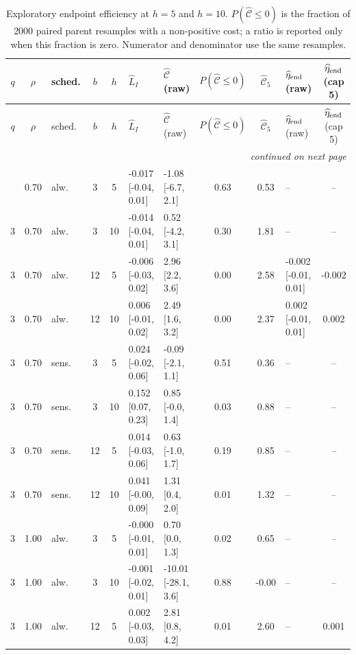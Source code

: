 \documentclass[10pt]{article}
\begin{document}
\begin{scriptsize}
\setlength{\tabcolsep}{3pt}
\begin{longtable}{cclcc l l c c l c}
\caption{Exploratory endpoint efficiency at $h=5$ and $h=10$. $P(\widehat{\mathcal C}\le0)$ is the fraction of 2000 paired parent resamples with a non-positive cost; a ratio is reported only when this fraction is zero. Numerator and denominator use the same resamples.}\label{tab:efficiency}\\
\toprule
$q$ & $\rho$ & sched. & $b$ & $h$ & $\widehat L_I$ & $\widehat{\mathcal C}$ (raw) & $P(\widehat{\mathcal C}\le0)$ & $\widehat{\mathcal C}_5$ & $\widehat\eta_{\rm end}$ (raw) & $\widehat\eta_{\rm end}$ (cap 5) \\
\midrule
\endfirsthead
\toprule
$q$ & $\rho$ & sched. & $b$ & $h$ & $\widehat L_I$ & $\widehat{\mathcal C}$ (raw) & $P(\widehat{\mathcal C}\le0)$ & $\widehat{\mathcal C}_5$ & $\widehat\eta_{\rm end}$ (raw) & $\widehat\eta_{\rm end}$ (cap 5) \\
\midrule
\endhead
\midrule
\multicolumn{11}{r}{\emph{continued on next page}}\\
\endfoot
\bottomrule
\endlastfoot
3 & 0.70 & alw. & 3 & 5 & -0.017 [-0.04, 0.01] & -1.08 [-6.7, 2.1] & 0.63 & 0.53 & -- & -- \\
3 & 0.70 & alw. & 3 & 10 & -0.014 [-0.04, 0.01] & 0.52 [-4.2, 3.1] & 0.30 & 1.81 & -- & -- \\
3 & 0.70 & alw. & 12 & 5 & -0.006 [-0.03, 0.02] & 2.96 [2.2, 3.6] & 0.00 & 2.58 & -0.002 [-0.01, 0.01] & -0.002 \\
3 & 0.70 & alw. & 12 & 10 & 0.006 [-0.01, 0.02] & 2.49 [1.6, 3.2] & 0.00 & 2.37 & 0.002 [-0.01, 0.01] & 0.002 \\
3 & 0.70 & sens. & 3 & 5 & 0.024 [-0.02, 0.06] & -0.09 [-2.1, 1.1] & 0.51 & 0.36 & -- & -- \\
3 & 0.70 & sens. & 3 & 10 & 0.152 [0.07, 0.23] & 0.85 [-0.0, 1.4] & 0.03 & 0.88 & -- & -- \\
3 & 0.70 & sens. & 12 & 5 & 0.014 [-0.03, 0.06] & 0.63 [-1.0, 1.7] & 0.19 & 0.85 & -- & -- \\
3 & 0.70 & sens. & 12 & 10 & 0.041 [-0.00, 0.09] & 1.31 [0.4, 2.0] & 0.01 & 1.32 & -- & -- \\
3 & 1.00 & alw. & 3 & 5 & -0.000 [-0.01, 0.01] & 0.70 [0.0, 1.3] & 0.02 & 0.65 & -- & -- \\
3 & 1.00 & alw. & 3 & 10 & -0.001 [-0.02, 0.01] & -10.01 [-28.1, 3.6] & 0.88 & -0.00 & -- & -- \\
3 & 1.00 & alw. & 12 & 5 & 0.002 [-0.03, 0.03] & 2.81 [0.8, 4.2] & 0.01 & 2.60 & -- & 0.001 \\

\end{longtable}
\end{scriptsize}
\end{document}
